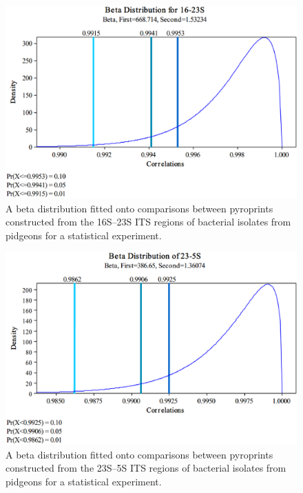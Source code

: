 \documentclass[12pt]{ucthesis}
\begin{document}
      \begin{figure}[t]
         \centering
         \includegraphics[width=0.70\columnwidth]{graphics/BetaDist16-23.eps}
         \caption{A beta distribution fitted onto comparisons between
                  pyroprints constructed from the 16S--23S ITS regions of
                  bacterial isolates from pidgeons for a statistical
                  experiment.}
         \label{fig:beta_16}
      \end{figure}

      \begin{figure}[t]
         \centering
         \includegraphics[width=0.70\columnwidth]{graphics/BetaDist23-5.eps}
         \caption{A beta distribution fitted onto comparisons between
                  pyroprints constructed from the 23S--5S ITS regions of
                  bacterial isolates from pidgeons for a statistical
                  experiment.}
         \label{fig:beta_23}
      \end{figure}
\end{document}
